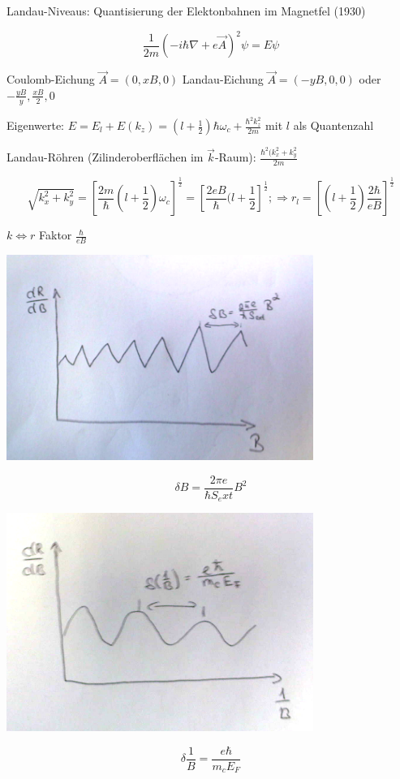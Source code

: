Landau-Niveaus: Quantisierung der Elektonbahnen im Magnetfel (1930)

\[\frac{1}{2m}(-i\hbar\nabla + e\vec A)^2\psi = E\psi\]

Coulomb-Eichung \(\vec A = (0,xB,0)\)
Landau-Eichung \(\vec A = (-yB,0,0)\) oder \(-\frac{yB}{y},\frac{xB}{2},0\)

Eigenwerte: \(E = E_l  + E(k_z) = (l+\frac{1}{2})\hbar\omega_c+\frac{\hbar^2k^2_z}{2m}\) mit \(l\) als Quantenzahl

Landau-Röhren (Zilinderoberflächen im \(\vec k\)-Raum): \(\frac{\hbar^2(k^2_x+k^2_y}{2m}\)

\[\sqrt{k^2_x+k^2_y}=\left[\frac{2m}{\hbar}(l+\frac{1}{2})\omega_c\right]^{\frac{1}{2}} = \left[ \frac{2eB}{\hbar}(l+\frac{1}{2}\right]^{\frac{1}{2}}; \Rightarrow r_l=\left[(l+\frac{1}{2})\frac{2\hbar}{eB}\right]^{\frac{1}{2}}\]

\(k \Leftrightarrow r \) Faktor \(\frac{\hbar}{eB}\)


\includegraphics[width=0.75\textwidth]{kap10_09.png}

\[\delta B = \frac{2\pi e}{\hbar S_ext}B^2\]

\includegraphics[width=0.75\textwidth]{kap10_10.png}

\[\delta \frac{1}{B} = \frac{e\hbar}{m_c E_F}\]



